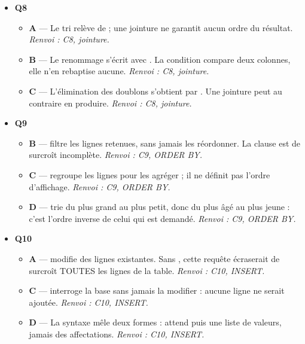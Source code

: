 \begin{itemize}
\begin{itemize}
    \item \textbf{D} — La longueur du texte n'entre pas en ligne de compte : toute chaîne littérale est délimitée par des apostrophes. \emph{Renvoi : C7, littéraux et identifiants dans WHERE.}
  \end{itemize}
  \item \textbf{Q8}
  \begin{itemize}
    \item \textbf{A} — Le tri relève de  ; une jointure ne garantit aucun ordre du résultat. \emph{Renvoi : C8, jointure.}
    \item \textbf{B} — Le renommage s'écrit avec . La condition  compare deux colonnes, elle n'en rebaptise aucune. \emph{Renvoi : C8, jointure.}
    \item \textbf{C} — L'élimination des doublons s'obtient par . Une jointure peut au contraire en produire. \emph{Renvoi : C8, jointure.}
  \end{itemize}
  \item \textbf{Q9}
  \begin{itemize}
    \item \textbf{B} —  filtre les lignes retenues, sans jamais les réordonner. La clause est de surcroît incomplète. \emph{Renvoi : C9, ORDER BY.}
    \item \textbf{C} —  regroupe les lignes pour les agréger ; il ne définit pas l'ordre d'affichage. \emph{Renvoi : C9, ORDER BY.}
    \item \textbf{D} —  trie du plus grand au plus petit, donc du plus âgé au plus jeune : c'est l'ordre inverse de celui qui est demandé. \emph{Renvoi : C9, ORDER BY.}
  \end{itemize}
  \item \textbf{Q10}
  \begin{itemize}
    \item \textbf{A} —  modifie des lignes existantes. Sans , cette requête écraserait de surcroît TOUTES les lignes de la table. \emph{Renvoi : C10, INSERT.}
    \item \textbf{C} —  interroge la base sans jamais la modifier : aucune ligne ne serait ajoutée. \emph{Renvoi : C10, INSERT.}
    \item \textbf{D} — La syntaxe mêle deux formes :  attend  puis une liste de valeurs, jamais des affectations. \emph{Renvoi : C10, INSERT.}
  \end{itemize}

\end{itemize}
